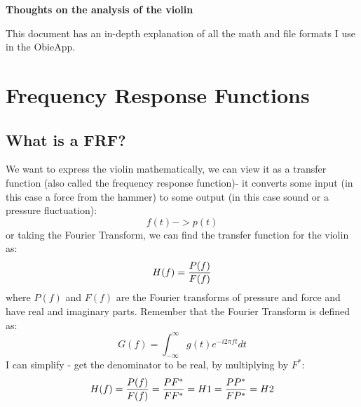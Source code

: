 \documentclass[11pt, oneside]{article}   	%
\begin{document}
\centerline {\bf Thoughts on the analysis of the violin}
This document has an in-depth explanation of all the math and file formats I use in the ObieApp.
\section{Frequency Response Functions}
\subsection{What is a FRF?}
We want to express the violin mathematically, we can view it as a transfer function (also called the frequency response function)- it converts some input (in this case a force from the hammer) to some output (in this case sound or a pressure fluctuation):
\begin{equation}
f(t) -> p(t)
\end{equation}
or taking the Fourier Transform, we can find the transfer function for the violin as:
\begin{equation}
H(f) = {P(f)\over F(f)}
\end{equation}
where $P(f)$ and $F(f)$ are the Fourier transforms of pressure and force and have real and imaginary parts.  Remember that the Fourier Transform is defined as:
\begin{equation}
G(f) = \int_{-\infty}^{\infty} g(t) e^{-i2\pi ft}dt
\end{equation}
I can simplify - get the denominator to be real, by multiplying by $F^*$:
\begin{equation}
H(f) = {P(f)\over F(f)}={PF^*\over FF^*}= H1 = {PP^*\over FP^*} = H2
\end{equation}
\end{document}
